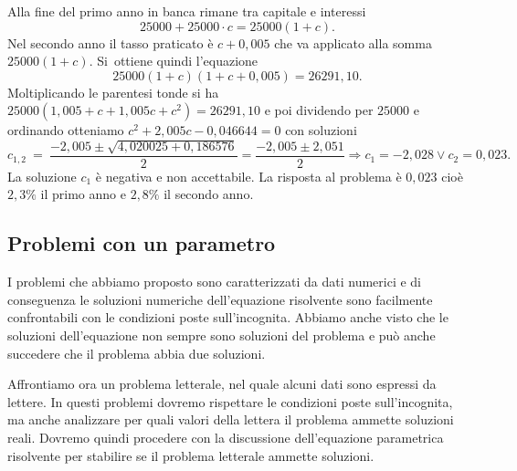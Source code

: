 \begin{soluzione}
Alla fine del primo anno in banca rimane tra capitale e interessi \[25000 + 25000 \cdot c = 25000 ( 1 + c ).\] Nel secondo anno il tasso praticato è $c+0,005$ che va applicato alla somma $25000(1+c)$. Si~ottiene quindi l'equazione \[25000 ( 1 + c ) ( 1 + c + 0,005 ) = 26291,10.\]
Moltiplicando le parentesi tonde si ha $25000 ( 1,005 + c + 1,005 c + c^{2} ) = 26291,10$ e poi dividendo per $25000$ e ordinando otteniamo
$c^{2} + 2,005 c - 0,046644=0$ con soluzioni
\[c_{1,2}~=~\dfrac{- 2,005 \pm \sqrt{4,020025 + 0,186576}}{2} = \dfrac{-2,005 \pm 2,051}{2}\Rightarrow c_{1} = - 2,028 \vee c_{2} = 0,023.\]
La soluzione $c_1$ è negativa e non accettabile. La risposta al problema è $0,023$ cioè $2,3\%$ il primo anno e $2,8\%$ il secondo anno.
\end{soluzione}
\vspazio\ovalbox{\risolvii \ref{ese:3.112}, \ref{ese:3.113}, \ref{ese:3.114}, \ref{ese:3.115}, \ref{ese:3.116}, \ref{ese:3.117}, \ref{ese:3.118}, \ref{ese:3.119}, \ref{ese:3.120}, \ref{ese:3.121}, \ref{ese:3.122},}

\vspazio\ovalbox{\ref{ese:3.123}, \ref{ese:3.124}, \ref{ese:3.125}, \ref{ese:3.126}, \ref{ese:3.127}, \ref{ese:3.128}, \ref{ese:3.129}, \ref{ese:3.130}, \ref{ese:3.131}, \ref{ese:3.132}, \ref{ese:3.133}, \ref{ese:3.134}, \ref{ese:3.135}, \ref{ese:3.136},}

\vspazio{}

\subsection{Problemi con un parametro}
I problemi che abbiamo proposto sono caratterizzati da dati numerici e di conseguenza le soluzioni numeriche dell’equazione risolvente sono facilmente
confrontabili con le condizioni poste sull’incognita. Abbiamo anche visto che le soluzioni dell’equazione non sempre sono soluzioni del problema e
può anche succedere che il problema abbia due soluzioni.

Affrontiamo ora un problema letterale, nel quale alcuni dati sono espressi da lettere. In questi problemi dovremo rispettare le condizioni poste sull’incognita, ma anche analizzare per quali valori della lettera il problema ammette soluzioni reali. Dovremo quindi procedere con la discussione dell’equazione parametrica risolvente per stabilire se il problema letterale ammette soluzioni.

